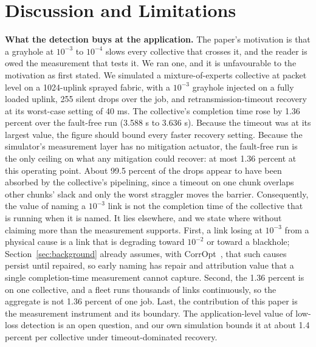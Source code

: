 \section{Discussion and Limitations}
\label{sec:discussion}

\textbf{What the detection buys at the application.} The paper's motivation is that a grayhole at $10^{-3}$ to $10^{-4}$ slows every collective that crosses it, and the reader is owed the measurement that tests it. We ran one, and it is unfavourable to the motivation as first stated. We simulated a mixture-of-experts collective at packet level on a 1024-uplink sprayed fabric, with a $10^{-3}$ grayhole injected on a fully loaded uplink, 255 silent drops over the job, and retransmission-timeout recovery at its worst-case setting of 40 ms. The collective's completion time rose by 1.36 percent over the fault-free run (3.588 s to 3.636 s). Because the timeout was at its largest value, the figure should bound every faster recovery setting. Because the simulator's measurement layer has no mitigation actuator, the fault-free run is the only ceiling on what any mitigation could recover: at most 1.36 percent at this operating point. About 99.5 percent of the drops appear to have been absorbed by the collective's pipelining, since a timeout on one chunk overlaps other chunks' slack and only the worst straggler moves the barrier. Consequently, the value of naming a $10^{-3}$ link is not the completion time of the collective that is running when it is named. It lies elsewhere, and we state where without claiming more than the measurement supports. First, a link losing at $10^{-3}$ from a physical cause is a link that is degrading toward $10^{-2}$ or toward a blackhole; Section~\ref{sec:background} already assumes, with CorrOpt~\cite{corropt}, that such causes persist until repaired, so early naming has repair and attribution value that a single completion-time measurement cannot capture. Second, the 1.36 percent is on one collective, and a fleet runs thousands of links continuously, so the aggregate is not 1.36 percent of one job. Last, the contribution of this paper is the measurement instrument and its boundary. The application-level value of low-loss detection is an open question, and our own simulation bounds it at about 1.4 percent per collective under timeout-dominated recovery.

